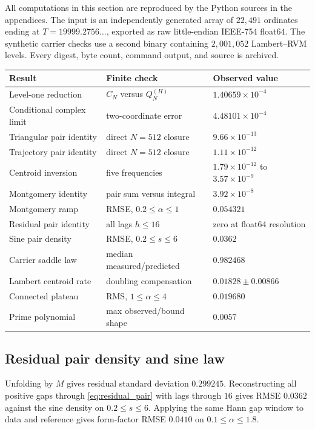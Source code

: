 \documentclass[11pt]{amsart}
\theoremstyle{definition}
\theoremstyle{remark}
\begin{document}
All computations in this section are reproduced by the Python sources in the
appendices.  The input is an independently generated array of $22{,}491$
ordinates ending at $T=19999.2756\ldots$, exported as raw little-endian
IEEE-754 float64.  The synthetic carrier checks use a second binary containing
$2{,}001{,}052$ Lambert--RVM levels.  Every digest, byte count, command output,
and source is archived.

\begin{center}\small
\begin{longtable}{@{}p{}p{}p{}@{}}
\toprule
Result & Finite check & Observed value\\
\midrule
\endhead
Level-one reduction & $C_N$ versus $Q_N^{(H)}$ & $1.40659\times10^{-4}$\\
Conditional complex limit & two-coordinate error & $4.48101\times10^{-4}$\\
Triangular pair identity & direct $N=512$ closure & $9.66\times10^{-13}$\\
Trajectory pair identity & direct $N=512$ closure & $1.11\times10^{-12}$\\
Centroid inversion & five frequencies & $1.79\times10^{-12}$ to $3.57\times10^{-9}$\\
Montgomery identity & pair sum versus integral & $3.92\times10^{-8}$\\
Montgomery ramp & RMSE, $0.2\le\alpha\le1$ & $0.054321$\\
Residual pair identity & all lags $h\le16$ & zero at float64 resolution\\
Sine pair density & RMSE, $0.2\le s\le6$ & $0.0362$\\
Carrier saddle law & median measured/predicted & $0.982468$\\
Lambert centroid rate & doubling compensation & $0.01828\pm0.00866$\\
Connected plateau & RMS, $1\le\alpha\le4$ & $0.019680$\\
Prime polynomial & max observed/bound shape & $0.0057$\\
\bottomrule
\end{longtable}
\end{center}

\subsection{Residual pair density and sine law}

Unfolding by $M$ gives residual standard deviation $0.299245$.  Reconstructing
all positive gaps through \eqref{eq:residual_pair} with lags through $16$ gives
RMSE $0.0362$ against the sine density on $0.2\leq s\leq6$.  Applying the same
Hann gap window to data and reference gives form-factor RMSE $0.0410$ on
$0.1\leq\alpha\leq1.8$.
\end{document}
